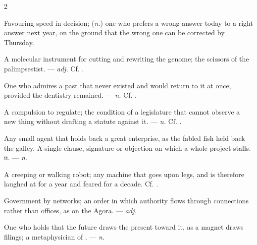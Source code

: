 \begin{multicols}{2}

 Favouring speed in decision; (\textit{n.}) one who prefers a wrong answer today to a right answer next year, on the ground that the wrong one can be corrected by Thursday.

 A molecular instrument for cutting and rewriting the genome; the scissors of the palimpsestist.  —  \textit{adj.} Cf. .

 One who admires a past that never existed and would return to it at once, provided the dentistry remained. —  \textit{n.} Cf. .

 A compulsion to regulate; the condition of a legislature that cannot observe a new thing without drafting a statute against it. —  \textit{n.} Cf. .

  Any small agent that holds back a great enterprise, as the fabled fish held back the galley.   A single clause, signature or objection on which a whole project stalls.   ii. —  \textit{n.}

 A creeping or walking robot; any machine that goes upon legs, and is therefore laughed at for a year and feared for a decade. Cf. .

 Government by networks; an order in which authority flows through connections rather than offices, as on the Agora. —  \textit{adj.}

 One who holds that the future draws the present toward it, as a magnet draws filings; a metaphysician of . —  \textit{n.}


\end{multicols}
